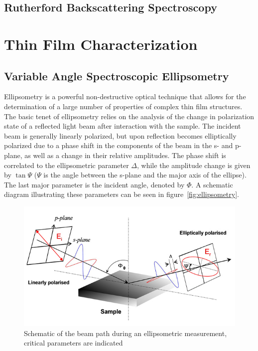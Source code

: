 
\subsection{Rutherford Backscattering Spectroscopy}





\section{Thin Film Characterization}


	
\subsection{Variable Angle Spectroscopic Ellipsometry}

Ellipsometry is a powerful non-destructive optical technique that allows for the determination of a large number of properties of complex thin film structures. The basic tenet of ellipsometry relies on the analysis of the change in polarization state of a reflected light beam after interaction with the sample. The incident beam is generally linearly polarized, but upon reflection becomes elliptically polarized due to a phase shift in the components of the beam in the s- and p-plane, as well as a change in their relative amplitudes. The phase shift is correlated to the ellipsometric parameter $\Delta$, while the amplitude change is given by $\tan\Psi$ ($\Psi$ is the angle between the s-plane and the major axis of the ellipse). The last major parameter is the incident angle, denoted by $\Phi$. A schematic diagram illustrating these parameters can be seen in figure~\vref{fig:ellipsometry}. 

\begin{figure}[tb]
   \centering
   \includegraphics[width=\linewidth]{./figures/characterization/ellipsometryDiagram_simple} 
   \caption[Ellipsometric Beam Path and Modeling Parameters]{Schematic of the beam path during an %
   					ellipsometric measurement, \\ critical parameters are indicated}
   \label{fig:ellipsometry}
\end{figure}

